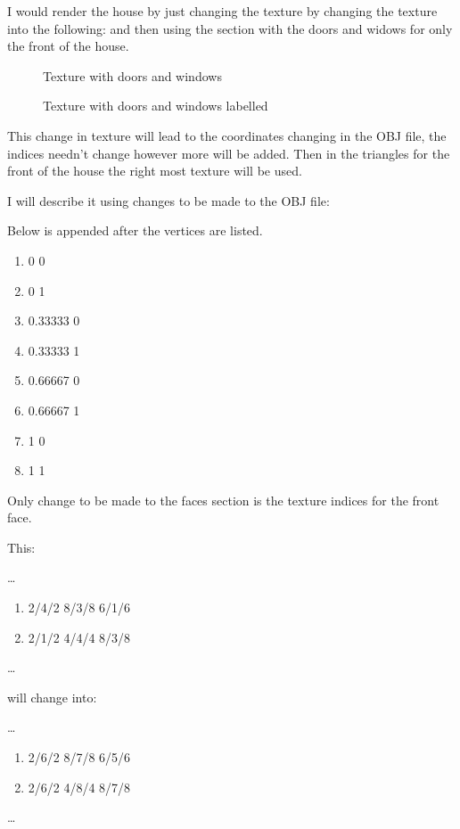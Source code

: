 \documentclass[10pt]{report}
\begin{document}
I would render the house by just changing the texture by changing the texture into the following: and then using the section with the doors and widows for only the front of the house.

\begin{figure}[H]
    \centering
    \caption{Texture with doors and windows}
\end{figure}

\begin{figure}[H]
    \centering
    \caption{Texture with doors and windows labelled}
\end{figure}


This change in texture will lead to the coordinates changing in the OBJ file, the indices needn't change however more will be added. Then in the triangles for the front of the house the right most texture will be used.


I will describe it using changes to be made to the OBJ file:

Below is appended after the vertices are listed.
\begin{enumerate}[vt ]
    \item 0 0  %
    \item 0 1  %
    \item 0.33333 0  %
    \item 0.33333 1  %
    \item 0.66667 0  %
    \item 0.66667 1  %
    \item 1 0 %
    \item 1 1 %
\end{enumerate}

Only change to be made to the faces section is the texture indices for the front face.

This: 

\dots
\begin{enumerate}[f]
    \item 2/4/2 8/3/8 6/1/6
    \item 2/1/2 4/4/4 8/3/8
\end{enumerate}
\dots

will change into:

\dots
\begin{enumerate}[f]
    \item 2/6/2 8/7/8 6/5/6
    \item 2/6/2 4/8/4 8/7/8
\end{enumerate}
\dots
\end{document}
